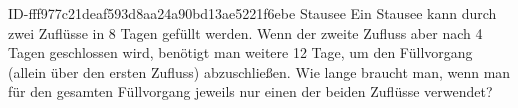 \begin{exercise}
      {ID-fff977c21deaf593d8aa24a90bd13ae5221f6ebe}
      {Stausee}
  \ifproblem\problem
    Ein Stausee kann durch zwei Zuflüsse in 8 Tagen gefüllt werden. Wenn
    der zweite Zufluss aber nach 4 Tagen geschlossen wird, benötigt man
    weitere 12 Tage, um den Füllvorgang (allein über den ersten Zufluss)
    abzuschließen. Wie lange braucht man, wenn man für den gesamten
    Füllvorgang jeweils nur einen der beiden Zuflüsse verwendet?
  \fi
\end{exercise}
